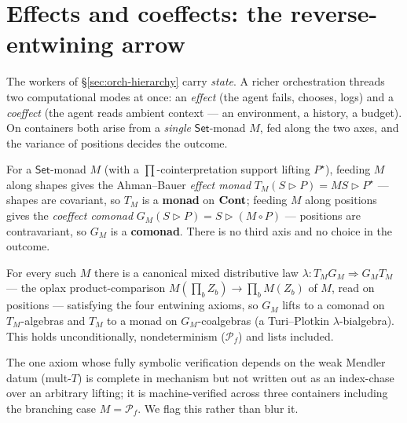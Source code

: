 \section{Effects and coeffects: the reverse-entwining arrow}\label{sec:orch-arrow}

The workers of \S\ref{sec:orch-hierarchy} carry \emph{state}. A richer orchestration threads two
computational modes at once: an \emph{effect} (the agent fails, chooses, logs) and a \emph{coeffect}
(the agent reads ambient context --- an environment, a history, a budget). On containers both arise
from a \emph{single} $\mathsf{Set}$-monad $M$, fed along the two axes, and the variance of positions
decides the outcome.

\begin{definition}\label{def:orch-feeds}
For a $\mathsf{Set}$-monad $M$ (with a $\prod$-cointerpretation support lifting $P^\star$), feeding
$M$ along shapes gives the Ahman--Bauer \emph{effect monad} $T_M(S\triangleright P)=MS\triangleright
P^\star$ --- shapes are covariant, so $T_M$ is a \textbf{monad} on $\mathbf{Cont}$; feeding $M$ along positions
gives the \emph{coeffect comonad} $G_M(S\triangleright P)=S\triangleright(M\circ P)$ --- positions are
contravariant, so $G_M$ is a \textbf{comonad}. There is no third axis and no choice in the outcome.
\end{definition}

\begin{theorem}
\label{thm:orch-bialgebra}
For every such $M$ there is a canonical mixed distributive law $\lambda:T_M G_M\Rightarrow G_M T_M$
--- the oplax product-comparison $M(\prod_b Z_b)\to\prod_b M(Z_b)$ of $M$, read on positions ---
satisfying the four entwining axioms, so $G_M$ lifts to a comonad on $T_M$-algebras and $T_M$ to a
monad on $G_M$-coalgebras (a Turi--Plotkin $\lambda$-bialgebra). This holds unconditionally,
nondeterminism ($\mathcal P_f$) and lists included.
\end{theorem}

\noindent The one axiom whose fully symbolic verification depends on the weak Mendler datum
(mult-$T$) is complete in mechanism but not written out as an index-chase over an arbitrary lifting;
it is machine-verified across three containers including the branching case $M=\mathcal P_f$. We flag
this rather than blur it.

